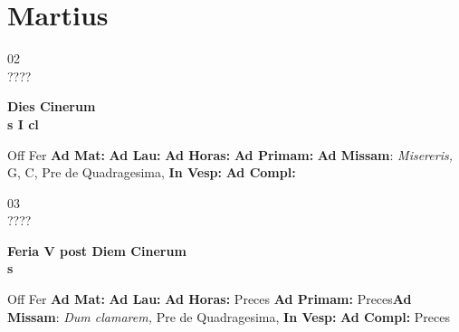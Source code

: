 \documentclass[10pt, openany]{book}
\begin{document}
    \chapter{Martius}
                    
    \begin{center}
        \begin{minipage}{3.5in}
            \vspace{2em}
            \begin{minipage}{0.5in}
                {\Huge 02} \\
                {\normalsize ????}
            \end{minipage}
            \begin{minipage}{3.0in}
                \textbf{ \large Dies Cinerum \\
                \textnormal{\normalsize s I cl}}

            \end{minipage}
            \begin{justify}Off Fer
                \textbf{Ad Mat: }
                \textbf{Ad Lau: }
                \textbf{Ad Horas: }
                \textbf{Ad Primam: }\textbf{Ad Missam}: \textit{Misereris,} G, C, Pre de Quadragesima, 
                \textbf{In Vesp: }
                \textbf{Ad Compl: }
            \end{justify}
        \end{minipage}
    \end{center}

    \begin{center}
        \begin{minipage}{3.5in}
            \vspace{2em}
            \begin{minipage}{0.5in}
                {\Huge 03} \\
                {\normalsize ????}
            \end{minipage}
            \begin{minipage}{3.0in}
                \textbf{ \large Feria V post Diem Cinerum \\
                \textnormal{\normalsize s}}

            \end{minipage}
            \begin{justify}Off Fer
                \textbf{Ad Mat: }
                \textbf{Ad Lau: }
                \textbf{Ad Horas: }Preces
                \textbf{Ad Primam: }Preces\textbf{Ad Missam}: \textit{Dum clamarem,} Pre de Quadragesima, 
                \textbf{In Vesp: }
                \textbf{Ad Compl: }Preces
            \end{justify}
        \end{minipage}
    \end{center}
\end{document}

